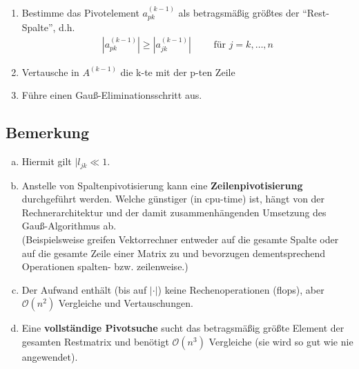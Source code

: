 \documentclass[ngerman,fontsize=11pt, paper=a4, parskip=half, titlepage=true, toc=bib]{scrbook}
\begin{document}
\begin{enumerate}[1.]
\item Bestimme das Pivotelement $a_{pk}^{(k-1)}$ 
  als betragsmäßig größtes der \enquote{Rest-Spalte}, d.h.
  \begin{gather*}
    |a_{pk}^{(k-1)}|\geq |a_{jk}^{(k-1)}| \qquad  \text{ für } j=k,\dots , n
  \end{gather*}
\item Vertausche in $A^{(k-1)}$ die k-te mit der p-ten Zeile
\item Führe einen Gauß-Eliminationsschritt aus.
\end{enumerate}

\subsection{Bemerkung}
\begin{enumerate}[a)]
\item Hiermit gilt $|l_{jk} \ll 1$.
\item Anstelle von Spaltenpivotisierung kann eine \textbf{Zeilenpivotisierung}
  durchgeführt werden.
  Welche günstiger (in cpu-time) ist, hängt von der Rechnerarchitektur und
  der damit zusammenhängenden Umsetzung des Gauß-Algorithmus ab.\\
  (Beispielsweise greifen Vektorrechner entweder auf die gesamte Spalte
  oder auf die gesamte Zeile einer Matrix zu und bevorzugen dementsprechend
  Operationen spalten- bzw. zeilenweise.)
\item Der Aufwand enthält (bis auf $|\cdot |$) keine Rechenoperationen (flops),
  aber $\mathcal{O}(n^2)$ Vergleiche und Vertauschungen.
\item Eine \textbf{vollständige Pivotsuche} sucht das betragsmäßig größte Element der gesamten Restmatrix und benötigt $\mathcal{O}(n^3) $ Vergleiche
  (sie wird so gut wie nie angewendet).
\end{enumerate}
\end{document}
